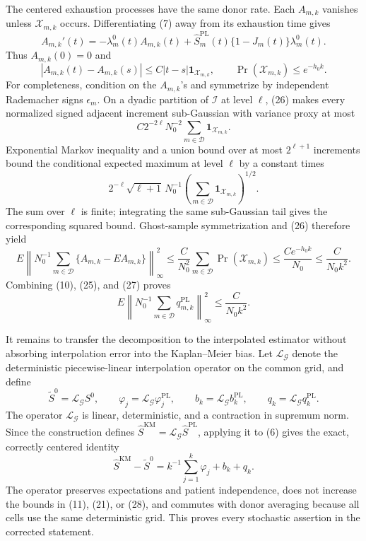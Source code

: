 The centered exhaustion processes have the same donor rate.  Each \(A_{m,k}\) vanishes unless \(\mathcal X_{m,k}\) occurs.  Differentiating (7) away from its exhaustion time gives
\[
 A_{m,k}'(t)=-\lambda_m^0(t)A_{m,k}(t)
 +\widehat S_m^{\mathrm{PL}}(t)\{1-J_m(t)\}\lambda_m^0(t).
\]
Thus \(A_{m,k}(0)=0\) and
\[
 |A_{m,k}(t)-A_{m,k}(s)|
 \le C|t-s|\mathbf 1_{\mathcal X_{m,k}},
 \qquad
 \Pr(\mathcal X_{m,k})\le e^{-h_0k}.                        \tag{26}
\]
For completeness, condition on the \(A_{m,k}\)'s and symmetrize by independent Rademacher signs \(\epsilon_m\).  On a dyadic partition of \(\mathcal I\) at level \(\ell\), (26) makes every normalized signed adjacent increment sub-Gaussian with variance proxy at most
\[
 C2^{-2\ell}N_0^{-2}\sum_{m\in\mathcal D}
 \mathbf 1_{\mathcal X_{m,k}}.
\]
Exponential Markov inequality and a union bound over at most \(2^{\ell+1}\) increments bound the conditional expected maximum at level \(\ell\) by a constant times
\[
 2^{-\ell}\sqrt{\ell+1}\,
 N_0^{-1}\left(\sum_{m\in\mathcal D}
 \mathbf 1_{\mathcal X_{m,k}}\right)^{1/2}.
\]
The sum over \(\ell\) is finite; integrating the same sub-Gaussian tail gives the corresponding squared bound.  Ghost-sample symmetrization and (26) therefore yield
\[
 E\left\|N_0^{-1}\sum_{m\in\mathcal D}
 \{A_{m,k}-EA_{m,k}\}\right\|_\infty^2
 \le \frac{C}{N_0^2}\sum_{m\in\mathcal D}
 \Pr(\mathcal X_{m,k})
 \le \frac{Ce^{-h_0k}}{N_0}
 \le \frac{C}{N_0k^2}.                                      \tag{27}
\]
Combining (10), (25), and (27) proves
\[
 E\left\|N_0^{-1}\sum_{m\in\mathcal D}q_{m,k}^{\mathrm{PL}}
 \right\|_\infty^2
 \le \frac{C}{N_0k^2}.                                      \tag{28}
\]

It remains to transfer the decomposition to the interpolated estimator without absorbing interpolation error into the Kaplan--Meier bias.  Let \(\mathcal L_{\mathcal G}\) denote the deterministic piecewise-linear interpolation operator on the common grid, and define
\[
 \widetilde S^0=\mathcal L_{\mathcal G}S^0,
 \qquad
 \varphi_j=\mathcal L_{\mathcal G}\varphi_j^{\mathrm{PL}},
 \qquad
 b_k=\mathcal L_{\mathcal G}b_k^{\mathrm{PL}},
 \qquad
 q_k=\mathcal L_{\mathcal G}q_k^{\mathrm{PL}}.
\]
The operator \(\mathcal L_{\mathcal G}\) is linear, deterministic, and a contraction in supremum norm.  Since the construction defines \(\widehat S^{\mathrm{KM}}=\mathcal L_{\mathcal G}\widehat S^{\mathrm{PL}}\), applying it to (6) gives the exact, correctly centered identity
\[
 \widehat S^{\mathrm{KM}}-\widetilde S^0
 =k^{-1}\sum_{j=1}^k\varphi_j+b_k+q_k.                       \tag{29}
\]
The operator preserves expectations and patient independence, does not increase the bounds in (11), (21), or (28), and commutes with donor averaging because all cells use the same deterministic grid.  This proves every stochastic assertion in the corrected statement.

